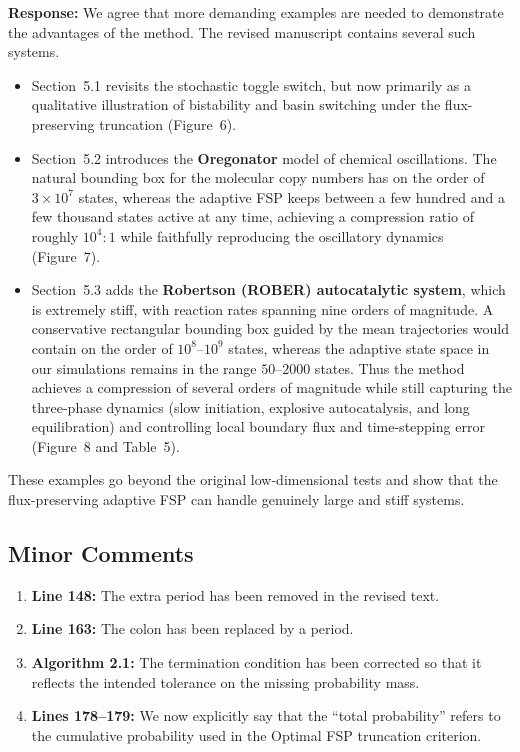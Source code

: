 \documentclass[11pt]{article}
\begin{document}
\textbf{Response:} We agree that more demanding examples are needed to demonstrate the
advantages of the method. The revised manuscript contains several such systems.

\begin{itemize}
  \item Section~5.1 revisits the stochastic toggle switch, but now primarily as a
        qualitative illustration of bistability and basin switching under the
        flux-preserving truncation (Figure~6).
  \item Section~5.2 introduces the \textbf{Oregonator} model of chemical
        oscillations. The natural bounding box for the molecular copy numbers has
        on the order of $3\times 10^7$ states, whereas the adaptive FSP keeps
        between a few hundred and a few thousand states active at any time,
        achieving a compression ratio of roughly $10^4:1$ while faithfully
        reproducing the oscillatory dynamics (Figure~7).
  \item Section~5.3 adds the \textbf{Robertson (ROBER) autocatalytic system}, which
        is extremely stiff, with reaction rates spanning nine orders of magnitude.
        A conservative rectangular bounding box guided by the mean trajectories
        would contain on the order of $10^8$–$10^9$ states, whereas the adaptive
        state space in our simulations remains in the range $50$--$2000$ states.
        Thus the method achieves a compression of several orders of magnitude
        while still capturing the three-phase dynamics (slow initiation, explosive
        autocatalysis, and long equilibration) and controlling local boundary flux
        and time-stepping error (Figure~8 and Table~5).

\end{itemize}

These examples go beyond the original low-dimensional tests and show that the
flux-preserving adaptive FSP can handle genuinely large and stiff systems.

\subsection*{Minor Comments}

\begin{enumerate}
  \item \textbf{Line 148:} The extra period has been removed in the revised text.
  \item \textbf{Line 163:} The colon has been replaced by a period.
  \item \textbf{Algorithm 2.1:} The termination condition has been corrected so that
        it reflects the intended tolerance on the missing probability mass.
  \item \textbf{Lines 178–179:} We now explicitly say that the ``total probability''
        refers to the cumulative probability used in the Optimal FSP truncation
        criterion.
\end{enumerate}
\end{document}
